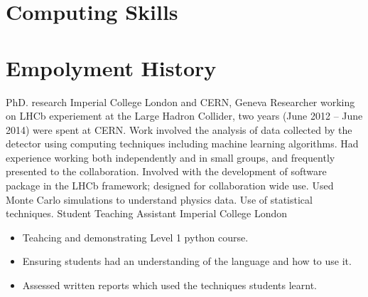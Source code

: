 \section{Computing Skills}


\section{Empolyment History}
{PhD. research}
{Imperial College London and CERN, Geneva}
{}{}
{
  Researcher working on LHCb experiement at the Large Hadron Collider, two years (June 2012 -- June
  2014) were spent at CERN.
  Work involved the analysis of data collected by the detector using computing techniques including
  machine learning algorithms.
  Had experience working both independently and in small groups, and frequently presented to the
  collaboration.
  Involved with the development of software package in the LHCb framework; designed for
  collaboration wide use.
  Used Monte Carlo simulations to understand physics data.
  Use of statistical techniques.
}
{Student Teaching Assistant}
{Imperial College London}
{}{}
{
  \begin{itemize}
    \item Teahcing and demonstrating Level 1 python course.
    \item Ensuring students had an understanding of the language and how to use it.
    \item Assessed written reports which used the techniques students learnt.
  \end{itemize}
}

